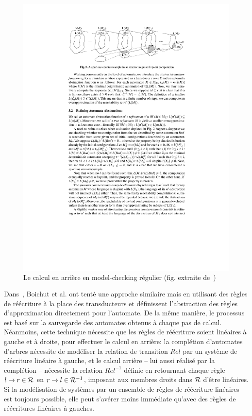 \begin{figure}[ht!]
  \centering
  \includegraphics[width=14cm]{4_contre_ex/armc}
  \caption{\footnotesize Le calcul en arrière en model-checking régulier (fig. extraite de~\cite{DBLP:conf/cav/BouajjaniHV04})}
\end{figure}

Dans~\cite{BCHK08}, Boichut et al. ont tenté une approche similaire mais en utilisant des
règles de réécriture à la place des transducteurs et définissent l'abstraction des règles d'approximation
directement pour l'automate. De la même manière, le processus est basé sur la sauvegarde des automates
obtenus à chaque pas de calcul. Néanmoins, cette technique nécessite
que les règles de réécriture soient linéaires à gauche et à droite, pour effectuer le
calcul en arrière: la complétion d'automates d'arbres nécessite de
modéliser la relation de transition $Rel$ par un système de réécriture
linéaire à gauche, et le calcul arrière -- lui aussi réalisé par la
complétion -- nécessite la relation $Rel^{-1}$ définie en retournant
chaque règle $l \rightarrow r \in \mathcal R$ en $r \rightarrow l \in \mathcal R^{-1}$, imposant aux
membres droits dans $\mathcal R$ d'être linéaires.  Si la modélisation de
systèmes par un ensemble de règles de réécriture linéaires est
toujours possible, elle peut s'avérer moins immédiate qu'avec
des règles de réécritures linéaires à gauches.



